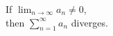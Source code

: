 \documentclass[border=6pt]{standalone}
\begin{document}
\parbox{1.5in}{If $\displaystyle\lim_{n\to\infty} a_n \neq 0$,\\
then $\displaystyle\sum_{n=1}^\infty a_n$ diverges.}
\end{document}
